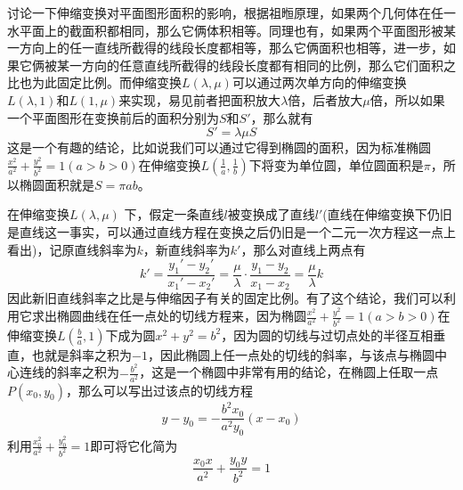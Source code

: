 \begin{example}
  讨论一下伸缩变换对平面图形面积的影响，根据祖暅原理，如果两个几何体在任一水平面上的截面积都相同，那么它俩体积相等。同理也有，如果两个平面图形被某一方向上的任一直线所截得的线段长度都相等，那么它俩面积也相等，进一步，如果它俩被某一方向的任意直线所截得的线段长度都有相同的比例，那么它们面积之比也为此固定比例。而伸缩变换$L(\lambda, \mu)$可以通过两次单方向的伸缩变换$L(\lambda, 1)$和$L(1, \mu)$来实现，易见前者把面积放大$\lambda$倍，后者放大$\mu$倍，所以如果一个平面图形在变换前后的面积分别为$S$和$S'$，那么就有
  \begin{equation}
    \label{eq:area-for-scale-translation}
  S'=\lambda \mu S
  \end{equation}
这是一个有趣的结论，比如说我们可以通过它得到椭圆的面积，因为标准椭圆$\frac{x^2}{a^2}+\frac{y^2}{b^2}=1(a>b>0)$在伸缩变换$L(\frac{1}{a}, \frac{1}{b})$下将变为单位圆，单位圆面积是$\pi$，所以椭圆面积就是$S=\pi a b$。
\end{example}

\begin{example}
  \label{ep:the-tangent-after-scale-translation}
  在伸缩变换$L(\lambda, \mu)$ 下，假定一条直线$l$被变换成了直线$l'$(直线在伸缩变换下仍旧是直线这一事实，可以通过直线方程在变换之后仍旧是一个二元一次方程这一点上看出)，记原直线斜率为$k$，新直线斜率为$k'$，那么对直线上两点有
  \begin{equation}
    \label{eq:tangent-of-scale-translation}
  k'=\frac{y_1'-y_2'}{x_1'-x_2'}=\frac{\mu}{\lambda}\cdot \frac{y_1-y_2}{x_1-x_2}=\frac{\mu}{\lambda}k
  \end{equation}
  因此新旧直线斜率之比是与伸缩因子有关的固定比例。有了这个结论，我们可以利用它求出椭圆曲线在任一点处的切线方程来，因为椭圆$\frac{x^2}{a^2}+\frac{y^2}{b^2}=1(a>b>0)$在伸缩变换$L(\frac{b}{a},1)$下成为圆$x^2+y^2=b^2$，因为圆的切线与过切点处的半径互相垂直，也就是斜率之积为$-1$，因此椭圆上任一点处的切线的斜率，与该点与椭圆中心连线的斜率之积为$-\frac{b^2}{a^2}$，这是一个椭圆中非常有用的结论，在椭圆上任取一点$P(x_0,y_0)$，那么可以写出过该点的切线方程
  \begin{equation*}
  y-y_0=-\frac{b^2x_0}{a^2y_0}(x-x_0)
  \end{equation*}
  利用$\frac{x_0^2}{a^2}+\frac{y_0^2}{b^2}=1$即可将它化简为
  \begin{equation*}
  \frac{x_0x}{a^2}+\frac{y_0y}{b^2}=1
  \end{equation*}
\end{example}

